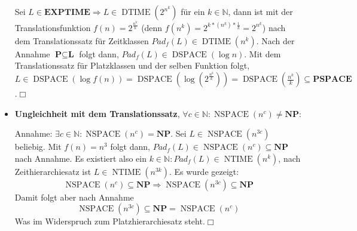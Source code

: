 \documentclass[landscape, 8pt, a4paper]{extarticle}
\newcommand{\poly}{\textbf{P}}
\newcommand{\npoly}{\textbf{NP}}
\newcommand{\N}{\mathbb{N}}
\begin{document}
\begin{multicols}{3}
\begin{itemize}
		Sei $L\in\textbf{EXPTIME}\Rightarrow L\in \operatorname{DTIME}(2^{n^k})$ für ein $k\in\N$, dann ist mit der Translationsfunktion $f(n)=2^{\frac{n^k}{k}}$ (denn $f(n^k)=2^{k*(n^k)*\frac1k}=2^{n^k}$) nach dem Translationssatz für Zeitklassen $Pad_f(L)\in\operatorname{DTIME}(n^k)$.
		Nach der Annahme $\poly\subseteq\textbf{L}$ folgt dann, $Pad_f(L)\in\operatorname{DSPACE}(\log n)$.
		Mit dem Translationssatz für Platzklassen und der selben Funktion folgt, $L\in \operatorname{DSPACE}(\log f(n))=\operatorname{DSPACE}(\log (2^{\frac{n^k}{k}}))=\operatorname{DSPACE}(\frac{n^k}{k})\subseteq\textbf{PSPACE}$.\hfill$\Box$

		\item \textbf{Ungleichheit mit dem Translationssatz}, $\forall c\in\N: \operatorname{NSPACE}(n^c)\neq \npoly$:

		Annahme: $\exists c\in\N: \operatorname{NSPACE}(n^c)=\npoly$. Sei $L\in\operatorname{NSPACE}(n^{3c})$ beliebig. Mit $f(n)=n^3$ folgt dann, $Pad_f(L)\in\operatorname{NSPACE}(n^c)\subseteq\npoly$ nach Annahme. Es existiert also ein $k\in\N: Pad_f(L)\in\operatorname{NTIME}(n^k)$, nach Zeithierarchiesatz ist $L\in \operatorname{NTIME}(n^{3k})$. Es wurde gezeigt:
		\begin{equation*}
			\operatorname{NSPACE}(n^c)\subseteq\npoly\Rightarrow\operatorname{NSPACE}(n^{3c})\subseteq\npoly
		\end{equation*}
		Damit folgt aber nach Annahme
		\begin{equation*}
			\operatorname{NSPACE}(n^{3c})\subseteq\npoly =\operatorname{NSPACE}(n^c)
		\end{equation*}
		Was im Widerspruch zum Platzhierarchiesatz steht.\hfill$\Box$
	\end{itemize}

\end{multicols}
\end{document}
